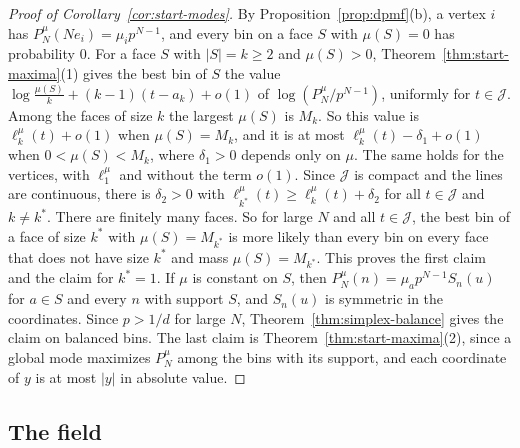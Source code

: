 \begin{proof}[Proof of Corollary~\ref{cor:start-modes}]
By Proposition~\ref{prop:dpmf}(b), a vertex $i$ has
$P^\mu_N(Ne_i)=\mu_ip^{N-1}$, and every bin on a face $S$ with $\mu(S)=0$ has
probability $0$. For a face $S$ with $|S|=k\ge2$ and $\mu(S)>0$,
Theorem~\ref{thm:start-maxima}(1) gives the best bin of $S$ the value
$\log\frac{\mu(S)}k+(k-1)(t-a_k)+o(1)$ of $\log(P^\mu_N/p^{N-1})$, uniformly
for $t\in\mathcal J$. Among the faces of size $k$ the largest $\mu(S)$ is
$M_k$. So this value is $\ell^\mu_k(t)+o(1)$ when $\mu(S)=M_k$, and it is at
most $\ell^\mu_k(t)-\delta_1+o(1)$ when $0<\mu(S)<M_k$, where $\delta_1>0$
depends only on $\mu$. The same holds for the vertices, with $\ell^\mu_1$ and
without the term $o(1)$. Since $\mathcal J$ is compact and the lines are
continuous, there is $\delta_2>0$ with
$\ell^\mu_{k^*}(t)\ge\ell^\mu_k(t)+\delta_2$ for all $t\in\mathcal J$ and
$k\ne k^*$. There are finitely many faces. So for large $N$ and all
$t\in\mathcal J$, the best bin of a face of size $k^*$ with $\mu(S)=M_{k^*}$ is
more likely than every bin on every face that does not have size $k^*$ and mass
$\mu(S)=M_{k^*}$. This proves the first claim and
the claim for $k^*=1$. If $\mu$ is constant on $S$, then
$P^\mu_N(n)=\mu_ap^{N-1}S_n(u)$ for $a\in S$ and every $n$ with support $S$, and
$S_n(u)$ is symmetric in the coordinates. Since $p>1/d$ for large $N$,
Theorem~\ref{thm:simplex-balance} gives the claim on balanced bins.
The last claim is Theorem~\ref{thm:start-maxima}(2), since a global mode
maximizes $P^\mu_N$ among the bins with its support, and each coordinate of $y$
is at most $|y|$ in absolute value.
\end{proof}

\subsection{The field}

